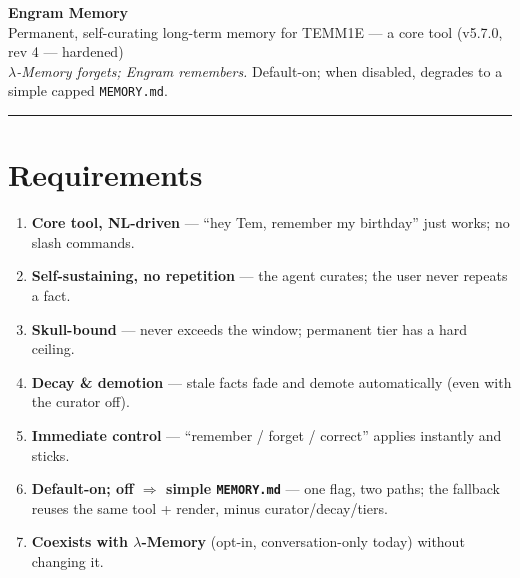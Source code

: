 \documentclass[11pt]{article}
\begin{document}
\begin{center}
{\LARGE\bfseries\color{accent} Engram Memory}\\[1pt]
{\large Permanent, self-curating long-term memory for TEMM1E — a core tool (v5.7.0, rev 4 — hardened)}\\[3pt]
{\small \emph{$\lambda$-Memory forgets; Engram remembers.} Default-on; when disabled, degrades to a simple capped \texttt{MEMORY.md}.}
\end{center}
\hrule\vspace{5pt}

\section{Requirements}
\begin{enumerate}[itemsep=0pt]
\item \textbf{Core tool, NL-driven} — ``hey Tem, remember my birthday'' just works; no slash commands.
\item \textbf{Self-sustaining, no repetition} — the agent curates; the user never repeats a fact.
\item \textbf{Skull-bound} — never exceeds the window; permanent tier has a hard ceiling.
\item \textbf{Decay \& demotion} — stale facts fade and demote automatically (even with the curator off).
\item \textbf{Immediate control} — ``remember / forget / correct'' applies instantly and sticks.
\item \textbf{Default-on; off $\Rightarrow$ simple \texttt{MEMORY.md}} — one flag, two paths; the fallback reuses the same tool + render, minus curator/decay/tiers.
\item \textbf{Coexists with $\lambda$-Memory} (opt-in, conversation-only today) without changing it.
\end{enumerate}
\end{document}
